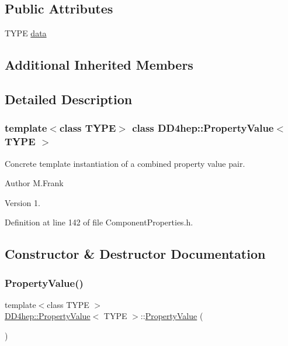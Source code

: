 \subsection*{Public Attributes}
\begin{DoxyCompactItemize}
\item 
T\+Y\+PE \hyperlink{class_d_d4hep_1_1_property_value_ad38a9abb3265886b815fa435ca481e24}{data}
\end{DoxyCompactItemize}
\subsection*{Additional Inherited Members}


\subsection{Detailed Description}
\subsubsection*{template$<$class T\+Y\+PE$>$\newline
class D\+D4hep\+::\+Property\+Value$<$ T\+Y\+P\+E $>$}

Concrete template instantiation of a combined property value pair. 

\begin{DoxyAuthor}{Author}
M.\+Frank 
\end{DoxyAuthor}
\begin{DoxyVersion}{Version}
1. 
\end{DoxyVersion}


Definition at line 142 of file Component\+Properties.\+h.



\subsection{Constructor \& Destructor Documentation}
\hypertarget{class_d_d4hep_1_1_property_value_a6dcb85ebdb83313c9593c86431b3316e}{}\label{class_d_d4hep_1_1_property_value_a6dcb85ebdb83313c9593c86431b3316e} 
\subsubsection{\texorpdfstring{Property\+Value()}{PropertyValue()}}
{\footnotesize\ttfamily template$<$class T\+Y\+PE $>$ \\
\hyperlink{class_d_d4hep_1_1_property_value}{D\+D4hep\+::\+Property\+Value}$<$ T\+Y\+PE $>$\+::\hyperlink{class_d_d4hep_1_1_property_value}{Property\+Value} (\begin{DoxyParamCaption}{ }\end{DoxyParamCaption})\hspace{0.3cm}{\ttfamily [inline]}}



